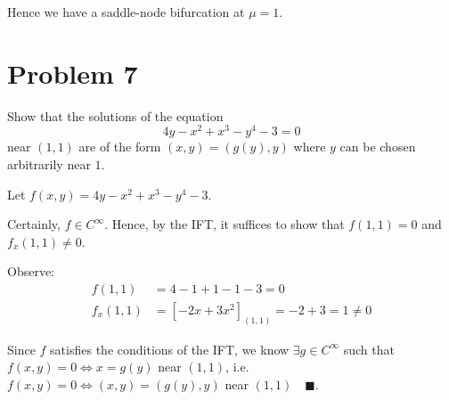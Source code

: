 \documentclass[12pt]{article}
\newcommand{\qed}{\quad \blacksquare}
\begin{document}
Hence we have a saddle-node bifurcation at $\mu = 1$.

\color{black}


\pagebreak
\section*{Problem 7}

Show that the solutions of the equation
\[
    4 y - x^2 + x^3 - y^4 - 3 = 0
\]
near $(1,1)$ are of the form $(x,y)=(g(y),y)$ where $y$ can be chosen arbitrarily near $1$.

\color{blue}
Let $f(x, y) = 4y - x^2 + x^3 - y^4 - 3$.

Certainly, $f \in C^{\infty}$. Hence, by the IFT, it suffices to show that $f(1, 1) = 0$ and $f_x(1, 1) \neq 0$.

Observe:
\begin{align*}
    f(1, 1)   & = 4 - 1 + 1 - 1 - 3 = 0                    \\
    f_x(1, 1) & = [-2x + 3x^2]_{(1, 1)} = -2 + 3 = 1\neq 0
\end{align*}

Since $f$ satisfies the conditions of the IFT, we know $\exists g \in C^{\infty}$ such that $f(x, y) = 0 \iff x = g(y)$ near $(1, 1)$, i.e. $f(x, y) = 0 \iff (x, y) = (g(y), y)$ near $(1, 1) \qed$.
\color{black}


\end{document}
